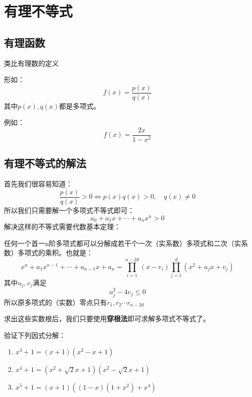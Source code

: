 \section{有理不等式}
\subsection{有理函数}
类比有理数的定义
\begin{definition}[有理函数]
    形如：
    $$
        f(x) = \frac{p(x)}{q(x)}
    $$
    其中$p(x),q(x)$都是多项式。
\end{definition}
例如：
$$
    f(x) = \frac{2x}{1-x^2}
$$
\subsection{有理不等式的解法}
首先我们很容易知道：
$$
    \frac{p(x)}{q(x)} > 0 \iff p(x)q(x)>0, \quad q(x)\ne 0
$$
所以我们只需要解一个多项式不等式即可：
$$
    a_0 + a_1x+\cdots+a_nx^n > 0
$$
解决这样的不等式需要代数基本定理：
\begin{theorem}[代数基本定理]
    任何一个首一n阶多项式都可以分解成若干个一次（实系数）多项式和二次（实系数）多项式的乘积。也就是：
    $$
        x^n + a_1x^{n-1}+\cdots+a_{n-1}x+a_n = \prod_{i=1}^{n-2d} (x-r_i) \prod_{j=1}^d(x^2+u_jx+v_j)
    $$
    其中$u_j,v_j$满足
    $$
        u_j^2-4v_j\le 0
    $$
    所以原多项式的（实数）零点只有$r_1,r_2\cdots r_{n-2d}$
\end{theorem}
求出这些实数根后，我们只要使用\textbf{穿根法}即可求解多项式不等式了。
\begin{exercise}
    验证下列因式分解：
    \begin{enumerate}
        \item $x^3+1 = (x+1)(x^2-x+1)$
        \item $x^4+1 = (x^2+\sqrt{2}x+1)(x^2-\sqrt{2}x+1)$
        \item $x^5+1 = (x+1)((1-x)(1+x^2)+x^4)$
    \end{enumerate}
\end{exercise}